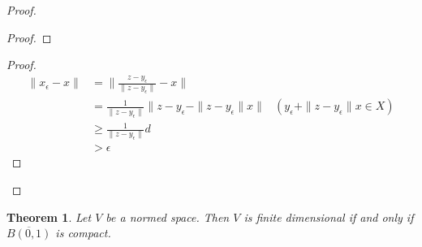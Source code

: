 \documentclass{book}
\let\qed\relax
\newtheorem{thm}[ax]{Theorem}
\theoremstyle{definition}
\begin{document}
\begin{proof}
\pf
{}
\begin{proof}
\end{proof}
\begin{proof}
	\pf
	\begin{align*}
		\| x_\epsilon - x \| & =
		\| \frac{z - y_\epsilon}{\|z - y_\epsilon\|} - x \| \\
		& = \frac{1}{\| z - y_\epsilon \|} \| z - y_\epsilon - \| z - y_\epsilon \| x \| & (y_\epsilon + \| z - y_\epsilon \| x \in X) \\
		& \geq \frac{1}{\| z - y_\epsilon \|} d \\
		& > \epsilon
	\end{align*}
\end{proof}
\qed
\end{proof}

\begin{thm}
Let $V$ be a normed space. Then $V$ is finite dimensional if and only if $\overline{B(0,1)}$ is compact.
\end{thm}
\end{document}
